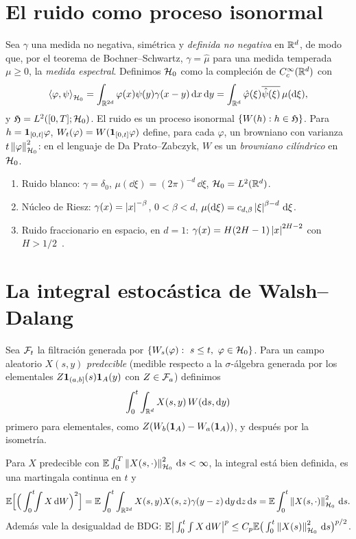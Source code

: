 \section{El ruido como proceso isonormal}
Sea $\gamma$ una medida no negativa, simétrica y \emph{definida no negativa} en $\mathbb{R}^d$, de modo que, por el
teorema de Bochner--Schwartz, $\gamma=\hat\mu$ para una medida temperada $\mu\ge0$, la \emph{medida espectral}.
Definimos $\mathcal{H}_0$ como la compleción de $C_c^\infty(\mathbb{R}^d)$ con
\[
  \left\langle \varphi, \psi\right\rangle_{\mathcal{H}_0}=\int_{\mathbb{R}^{2d}}\varphi(x)\psi(y)\gamma(x-y)\,\mathrm{d} x\,\mathrm{d} y=\int_{\mathbb{R}^d}\hat\varphi(\xi)\overline{\hat\psi(\xi)}\,\mu(\mathrm{d}\xi),
\]
y $\mathfrak{H}=L^2([0,T];\mathcal{H}_0)$. El ruido es un proceso isonormal $\{W(h):h\in\mathfrak{H}\}$. Para $h=\mathbf{1}_{[0,t]}\varphi$,
$W_t(\varphi)=W(\mathbf{1}_{[0,t]}\varphi)$ define, para cada $\varphi$, un browniano con varianza $t\left\lVert \varphi\right\rVert^2_{\mathcal{H}_0}$: en el lenguaje de
Da Prato--Zabczyk, $W$ es un \emph{browniano cilíndrico} en $\mathcal{H}_0$.

\begin{ejemplo}
\begin{enumerate}[label=(\alph*)]
  \item Ruido blanco: $\gamma=\delta_0$, $\mu(\dd\xi)=(2\pi)^{-d}\,\dd\xi$, $\mathcal{H}_0=L^2(\mathbb{R}^d)$.
  \item Núcleo de Riesz: $\gamma(x)=\left\lvert x\right\rvert^{-\beta}$, $0<\beta<d$, $\mu(\mathrm{d}\xi)=c_{d,\beta}\left\lvert \xi\right\rvert^{\beta-d}\,\mathrm{d}\xi$.
  \item Ruido fraccionario en espacio, en $d=1$: $\gamma(x)=H(2H-1)\left\lvert x\right\rvert^{2H-2}$ con $H>1/2$~\cite{HuNualartSong11}.
\end{enumerate}
\end{ejemplo}

\section{La integral estocástica de Walsh--Dalang}
Sea $\mathcal{F}_t$ la filtración generada por $\{W_s(\varphi):\ s\le t,\ \varphi\in\Hc_0\}$. Para un campo aleatorio $X(s,y)$
\emph{predecible} (medible respecto a la $\sigma$-álgebra generada por los elementales $Z\mathbf{1}_{(a,b]}(s)\mathbf{1}_A(y)$ con
$Z\in\mathcal{F}_a$) definimos
\[
  \int_0^t\int_{\mathbb{R}^d}X(s,y)\,W(\mathrm{d} s,\mathrm{d} y)
\]
primero para elementales, como $Z(W_b(\mathbf{1}_A)-W_a(\mathbf{1}_A))$, y después por la isometría.

\begin{teorema}\label{teo:walsh-dalang}
Para $X$ predecible con $\mathbb{E}\int_0^T\left\lVert X(s,\cdot)\right\rVert^2_{\mathcal{H}_0}\,\mathrm{d} s<
\infty$, la integral está bien definida, es una martingala continua en $t$ y
\[
  \mathbb{E}\Big[\Big(\int_0^t\!\!\int X\,\mathrm{d} W\Big)^2\Big]=\mathbb{E}\int_0^t\int_{\mathbb{R}^{2d}}X(s,y)X(s,z)\gamma(y-z)\,\mathrm{d} y\,\mathrm{d} z\,\mathrm{d} s=\mathbb{E}\int_0^t\left\lVert X(s,\cdot)\right\rVert^2_{\mathcal{H}_0}\,\mathrm{d} s.
\]
Además vale la desigualdad de BDG: $\mathbb{E}\big|\int_0^t\int X\,\mathrm{d} W\big|^p\le C_p\mathbb{E}\big(\int_0^t\left\lVert X(s)\right\rVert^2_{\mathcal{H}_0}\,\mathrm{d} s\big)^{p/2}$.
\end{teorema}

